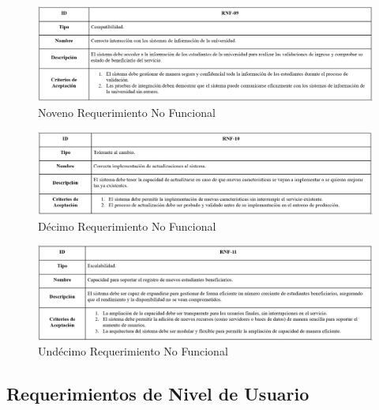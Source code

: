 \documentclass[stu, 12pt, letterpaper, donotrepeattitle, floatsintext, natbib]{apa7}
\begin{document}
\begin{figure}[H]
	\caption[]{Noveno Requerimiento No Funcional}
	\label{Noveno Requerimiento No Funcional}
	\includegraphics[width=1\linewidth]{Requerimientos No Funcionales/9. Requerimiento No Funcional.png}
\end{figure}

\begin{figure}[H]
	\caption[]{Décimo Requerimiento No Funcional}
	\label{Décimo Requerimiento No Funcional}
	\includegraphics[width=1\linewidth]{Requerimientos No Funcionales/10. Requerimiento No Funcional.png}
\end{figure}

\begin{figure}[H]
	\caption[]{Undécimo Requerimiento No Funcional}
	\label{Undécimo Requerimiento No Funcional}
	\includegraphics[width=1\linewidth]{Requerimientos No Funcionales/11. Requerimiento No Funcional.png}
\end{figure}

\subsection{Requerimientos de Nivel de Usuario}
\end{document}
